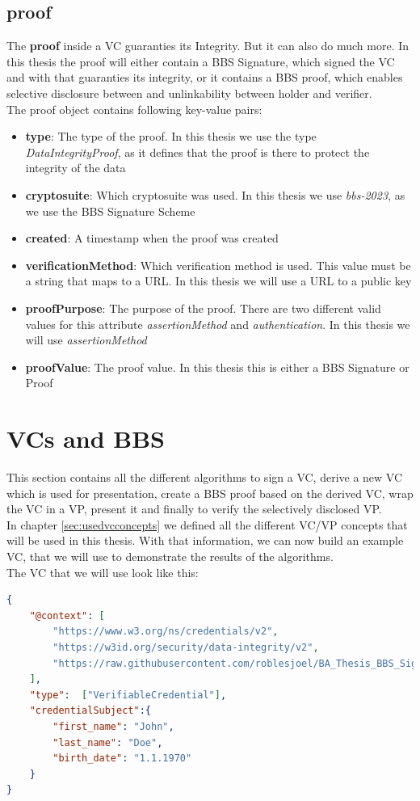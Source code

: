 \documentclass[
	a4paper               %
	,BCOR=0mm            %
	,bibliography=totoc   %
	,listof=totoc         %
	,monolingual
	,twoside=false
]{bfhthesis}              %
\begin{document}
\subsection{proof}
\label{subsec:vcproof}
The \textbf{proof} inside a VC guaranties its Integrity. But it can also do much more.
In this thesis the proof will either contain a BBS Signature, which signed the VC and with that guaranties its integrity, or it contains a BBS proof, which enables selective disclosure between and unlinkability between holder and verifier.\\
The proof object contains following key-value pairs:
\begin{itemize}
	\item \textbf{type}: The type of the proof. In this thesis we use the type \textit{DataIntegrityProof}, as it defines that the proof is there to protect the integrity of the data
	\item \textbf{cryptosuite}: Which cryptosuite was used. In this thesis we use \textit{bbs-2023}, as we use the BBS Signature Scheme
	\item \textbf{created}: A timestamp when the proof was created
	\item \textbf{verificationMethod}: Which verification method is used. This value must be a string that maps to a URL. In this thesis we will use a URL to a public key
	\item \textbf{proofPurpose}: The purpose of the proof. There are two different valid values for this attribute \textit{assertionMethod} and \textit{authentication}. In this thesis we will use \textit{assertionMethod}
	\item \textbf{proofValue}: The proof value. In this thesis this is either a BBS Signature or Proof
\end{itemize}

\section{VCs and BBS}
This section contains all the different algorithms to sign a VC, derive a new VC which is used for presentation, create a BBS proof based on the derived VC, wrap the VC in a VP, present it and finally to verify the selectively disclosed VP.\\

In chapter \ref{sec:usedvcconcepts} we defined all the different VC/VP concepts that will be used in this thesis. With that information, we can now build an example VC, that we will use to demonstrate the results of the algorithms.\\
The VC that we will use look like this:
\begin{lstlisting}[language=json,firstnumber=1,caption={Example VC},captionpos=b,label={list:example-vc}]
{
	"@context": [
		"https://www.w3.org/ns/credentials/v2",
		"https://w3id.org/security/data-integrity/v2",
		"https://raw.githubusercontent.com/roblesjoel/BA_Thesis_BBS_Signatures/docs/context/example_1.jsonld"
	],
	"type":  ["VerifiableCredential"],
	"credentialSubject":{
		"first_name": "John",
		"last_name": "Doe",
		"birth_date": "1.1.1970"
	}
}
\end{lstlisting}
\end{document}

